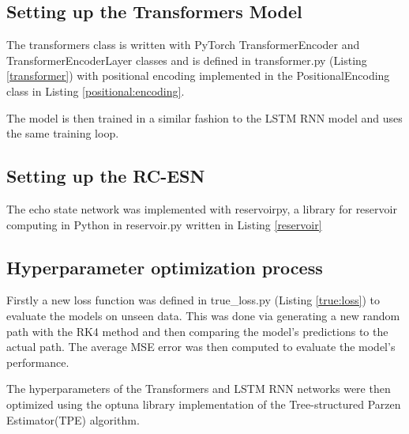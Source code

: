 \documentclass[11pt]{article}
\begin{document}
\subsection{Setting up the Transformers Model}

The transformers class is written with PyTorch TransformerEncoder and TransformerEncoderLayer classes and is defined in transformer.py (Listing \ref{transformer}) with positional encoding implemented in the PositionalEncoding class in Listing \ref{positional:encoding}.

The model is then trained in a similar fashion to the LSTM RNN model and uses the same training loop.

\subsection{Setting up the RC-ESN}

The echo state network was implemented with reservoirpy, a library for reservoir computing in Python in reservoir.py written in Listing \ref{reservoir}

\subsection{Hyperparameter optimization process}
Firstly a new loss function was defined in true\_loss.py (Listing \ref{true:loss}) to evaluate the models on unseen data. This was done via generating a new random path with the RK4 method and then comparing the model's predictions to the actual path. The average MSE error was then computed to evaluate the model's performance.


The hyperparameters of the Transformers and LSTM RNN networks were then optimized using the optuna library implementation of the Tree-structured Parzen Estimator(TPE) algorithm. 
\end{document}
